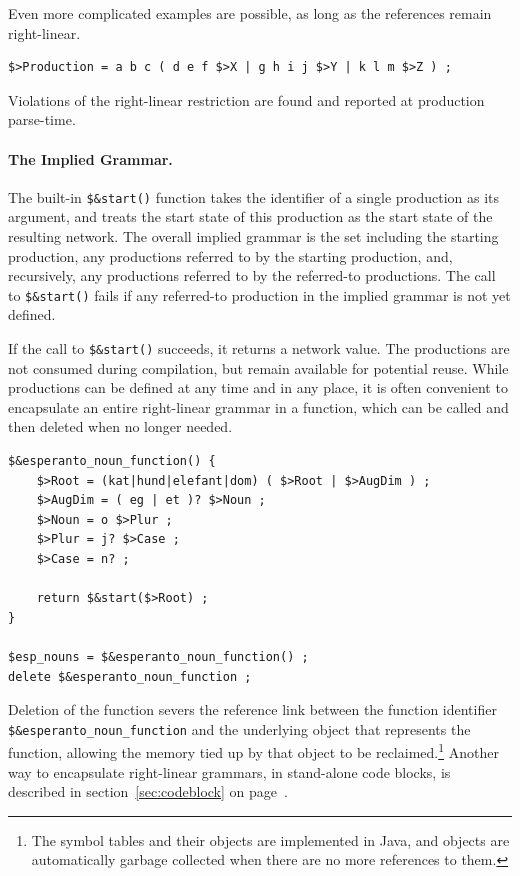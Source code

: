 \documentclass[letterpaper,12pt]{article}
\begin{document}
\noindent
Even more complicated examples are possible, as long as the references remain
right-linear. 

\begin{Verbatim}[fontsize=\small]
$>Production = a b c ( d e f $>X | g h i j $>Y | k l m $>Z ) ;
\end{Verbatim}

\noindent
Violations of the right-linear restriction are found and reported
at production parse-time.

\paragraph{The Implied Grammar.}

The built-in \verb!$&start()! function takes the identifier of a single
production as its argument, and treats the start state of this production as the
start state of the resulting network.  The overall implied grammar is the set
including the
starting production, any productions referred to by the starting
production, and, 
recursively, any productions referred to by the referred-to productions.
The call to \verb!$&start()! fails if any referred-to production in the
implied grammar is
not yet defined.

If the call to \verb!$&start()! succeeds, it returns a network value.  The
productions are not consumed during compilation, but remain available for
potential reuse.  While productions can be defined at any time and in any
place, it is often convenient to encapsulate an entire right-linear grammar
in a function, which can be called and then deleted when no longer
needed.

\begin{Verbatim}[fontsize=\small]
$&esperanto_noun_function() {
	$>Root = (kat|hund|elefant|dom) ( $>Root | $>AugDim ) ;
	$>AugDim = ( eg | et )? $>Noun ;
	$>Noun = o $>Plur ;
	$>Plur = j? $>Case ;
	$>Case = n? ;

	return $&start($>Root) ;
}

$esp_nouns = $&esperanto_noun_function() ;
delete $&esperanto_noun_function ;
\end{Verbatim}

Deletion of the function severs the reference link between the function
identifier \verb!$&esperanto_noun_function! and the underlying object that
represents the function, allowing the memory tied up by that object to be
reclaimed.\footnote{The symbol tables and their objects are implemented in
Java, and objects are automatically garbage collected when there are no
more references to them.}  Another way to encapsulate right-linear
grammars, in stand-alone code blocks, is described in
section~\ref{sec:codeblock} on page~\pageref{sec:codeblock}.
\end{document}
